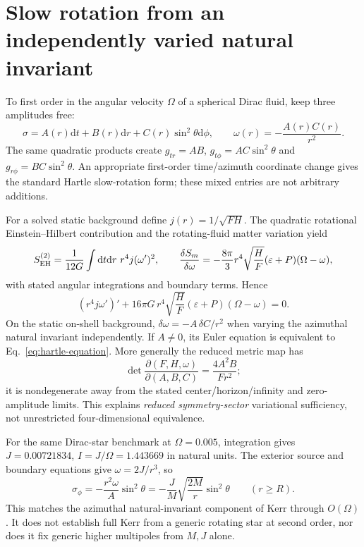 \documentclass[11pt,a4paper]{article}
\newcommand{\dd}{\mathrm d}
\begin{document}
\section{Slow rotation from an independently varied natural invariant}\label{sec:rotation}
To first order in the angular velocity $\Omega$ of a spherical Dirac fluid, keep three amplitudes free:
\begin{equation}\label{eq:sigma-slow}
\sigma=A(r)\dd t+B(r)\dd r+C(r)\sin^2\theta\dd\phi,
\qquad \omega(r)=-\frac{A(r)C(r)}{r^2}.
\end{equation}
The same quadratic products create $g_{tr}=AB$, $g_{t\phi}=AC\sin^2\theta$ and $g_{r\phi}=BC\sin^2\theta$. An appropriate first-order time/azimuth coordinate change gives the standard Hartle slow-rotation form; these mixed entries are not arbitrary additions.

For a solved static background define $j(r)=1/\sqrt{FH}$. The quadratic rotational Einstein--Hilbert contribution and the rotating-fluid matter variation yield
\begin{equation}\label{eq:hartle-action}
 S_{\rm EH}^{(2)}=\frac1{12G}\int\dd t\dd r\ r^4j(\omega')^2,\qquad
\frac{\delta S_m}{\delta\omega}=-\frac{8\pi}{3}r^4\sqrt{\frac HF}
(\varepsilon+P)(\Omega-\omega),
\end{equation}
with stated angular integrations and boundary terms. Hence
\begin{equation}\label{eq:hartle-equation}
\boxed{(r^4j\omega')'+16\pi G\,r^4\sqrt{\frac HF}
(\varepsilon+P)(\Omega-\omega)=0.}
\end{equation}
On the static on-shell background, $\delta\omega=-A\,\delta C/r^2$ when varying the azimuthal natural invariant independently. If $A\ne0$, its Euler equation is equivalent to Eq.~\eqref{eq:hartle-equation}. More generally the reduced metric map has
\begin{equation}\label{eq:slow-jacobian}
\boxed{\det\frac{\partial(F,H,\omega)}{\partial(A,B,C)}
=\frac{4A^2B}{Fr^2};}
\end{equation}
it is nondegenerate away from the stated center/horizon/infinity and zero-amplitude limits. This explains \emph{reduced symmetry-sector} variational sufficiency, not unrestricted four-dimensional equivalence.

For the same Dirac-star benchmark at $\Omega=0.005$, integration gives $J=0.00721834$, $I=J/\Omega=1.443669$ in natural units. The exterior source and boundary equations give $\omega=2J/r^3$, so
\begin{equation}\label{eq:slow-kerr-limit}
\boxed{\sigma_\phi=-\frac{r^2\omega}{A}\sin^2\theta
=-\frac JM\sqrt{\frac{2M}{r}}\sin^2\theta\qquad(r\ge R).}
\end{equation}
This matches the azimuthal natural-invariant component of Kerr through $O(\Omega)$. It does not establish full Kerr from a generic rotating star at second order, nor does it fix generic higher multipoles from $M,J$ alone.
\end{document}
